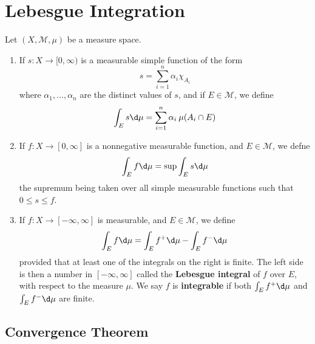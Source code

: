 \documentclass[12pt, a4paper, oneside]{book}
\begin{document}
\section{Lebesgue Integration} %
\begin{definition}
    Let $(X,\mathcal{M},\mu)$ be a measure space.
    \begin{enumerate}
        \item
              If $s:X\longrightarrow[0,\infty)$ is a measurable simple function of the form
              $$s=\sum_{i=1}^{n}\alpha_{i}\chi_{A_{i}}$$
              where $\alpha_1,\ldots,\alpha_n$ are the distinct values of $s$, and if $E\in\mathcal{M}$, we define
              \begin{equation*}
                  \int_{E}s\d \mu=\sum_{i=1}^{n}\alpha_{i}\:\mu(A_{i}\cap E)
              \end{equation*}

        \item
              If $f:X\to[0,\infty]$ is a nonnegative measurable function, and $E\in\mathcal{M}$, we defne
              $$\int_{E}f\d \mu=\sup\int_{E}s\d \mu$$
              the supremum being taken over all simple measurable functions such that $0\leq s\leq f$.

        \item
              If $f:X\to[-\infty,\infty]$ is measurable, and $E\in\mathcal{M}$, we define
              \begin{equation*}
                  \int_Ef\d \mu=\int_Ef^+\d \mu-\int_Ef^-\d \mu
              \end{equation*}
              provided that at least one of the integrals on the right is finite. The left side is then a number in $[-\infty,\infty]$ called the \textbf{Lebesgue integral} of $f$ over $E$,  with respect to the measure $\mu$.
              We say $f$ is \textbf{integrable} if both $\int_Ef^+\d \mu$ and $\int_Ef^-\d \mu$ are finite.
    \end{enumerate}
\end{definition}




\subsection{Convergence Theorem}
\end{document}
